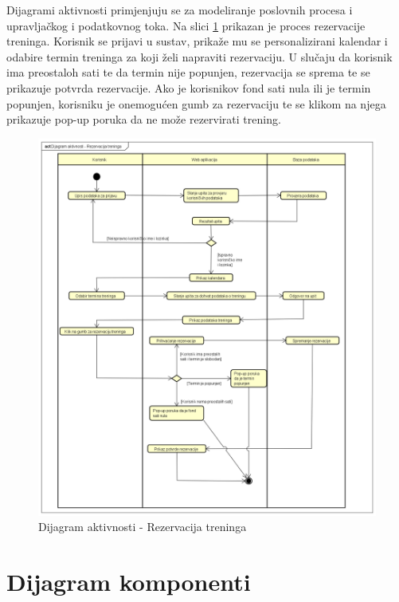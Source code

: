{{{{{{			 {Dijagrami aktivnosti primjenjuju se za modeliranje poslovnih procesa i upravljačkog i podatkovnog toka. Na slici \ref{fig:dijagramaktivnosti} prikazan je proces rezervacije treninga. Korisnik se prijavi u sustav, prikaže mu se personalizirani kalendar i odabire termin treninga za koji želi napraviti rezervaciju. U slučaju da korisnik ima preostaloh sati te da termin nije popunjen, rezervacija se sprema te se prikazuje potvrda rezervacije. Ako je korisnikov fond sati nula ili je termin popunjen, korisniku je onemogućen gumb za rezervaciju te se klikom na njega prikazuje pop-up poruka da ne može rezervirati trening.}
			 
			 \begin{figure}[H]
			 	\includegraphics[scale=0.35]{dijagrami/Dijagram aktivnosti - Rezervacija treninga.png} %
			 	\centering
			 	\caption{Dijagram aktivnosti - Rezervacija treninga}
			 	\label{fig:dijagramaktivnosti}
			 \end{figure}
			
			\eject
		\section{Dijagram komponenti}
		
}}}}}}
